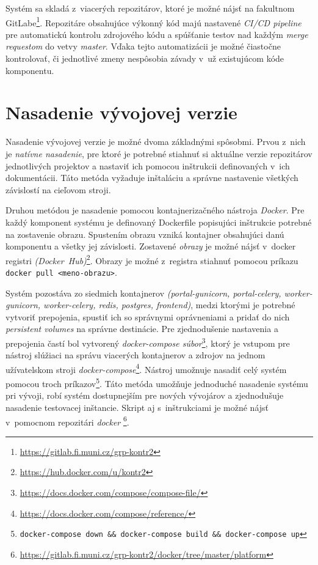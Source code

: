 \documentclass[
  digital, %
  oneside, %
  table,   %
  lof,     %
  lot,   %
]{fithesis3}
\newcommand*{\footurl}[1]{\footnote{\url{#1}}}
\begin{document}
Systém sa skladá z~viacerých repozitárov, ktoré je možné nájsť na fakultnom GitLabe\footnote{\url{https://gitlab.fi.muni.cz/grp-kontr2}}. Repozitáre obsahujúce výkonný kód majú nastavené \emph{CI/CD pipeline} pre automatickú kontrolu zdrojového kódu a spúšťanie testov nad každým \emph{merge requestom} do vetvy \emph{master}. Vďaka tejto automatizácii je možné čiastočne kontrolovať, či jednotlivé zmeny nespôsobia závady v~už existujúcom kóde komponentu.

\section{Nasadenie vývojovej verzie}

Nasadenie vývojovej verzie je možné dvoma základnými spôsobmi. Prvou z~nich je \emph{natívne nasadenie}, pre ktoré je potrebné stiahnuť si aktuálne verzie repozitárov jednotlivých projektov a nastaviť ich pomocou inštrukcii definovaných v~ich dokumentácii. Táto metóda vyžaduje inštaláciu a správne nastavenie všetkých závislostí na cieľovom stroji.

Druhou metódou je nasadenie pomocou kontajnerizačného nástroja \emph{Docker}. Pre každý komponent systému je definovaný Dockerfile popisujúci inštrukcie potrebné na zostavenie obrazu. Spustením obrazu vzniká kontajner obsahujúci danú komponentu a všetky jej závislosti. Zostavené \emph{obrazy} je možné nájsť v~docker registri \emph{(Docker~Hub)}\footnote{\url{https://hub.docker.com/u/kontr2}}. Obrazy je možné z~registra stiahnuť pomocou príkazu \texttt{docker pull <meno-obrazu>}.

Systém pozostáva zo siedmich kontajnerov \emph{(portal-gunicorn, portal-celery, worker-gunicorn, worker-celery, redis, postgres, frontend)}, medzi ktorými je potrebné vytvoriť prepojenia, spustiť ich so správnymi oprávneniami a pridať do nich \emph{persistent volumes} na správne destinácie. Pre zjednodušenie nastavenia a prepojenia častí bol vytvorený \emph{docker-compose súbor}\footnote{\url{https://docs.docker.com/compose/compose-file/}}, ktorý je vstupom pre nástroj slúžiaci na správu viacerých kontajnerov a zdrojov na jednom užívatelskom stroji \emph{docker-compose}\footnote{\url{https://docs.docker.com/compose/reference/}}. Nástroj umožnuje nasadiť celý systém pomocou troch príkazov\footnote{\texttt{docker-compose down \&\& docker-compose build \&\& docker-compose up}}. Táto metóda umožňuje jednoduché nasadenie systému pri vývoji, robí systém dostupnejším pre nových vývojárov a zjednodušuje nasadenie testovacej inštancie. Skript aj s~inštrukciami je možné nájsť v~pomocnom repozitári \emph{docker} \footurl{https://gitlab.fi.muni.cz/grp-kontr2/docker/tree/master/platform}.
\end{document}
